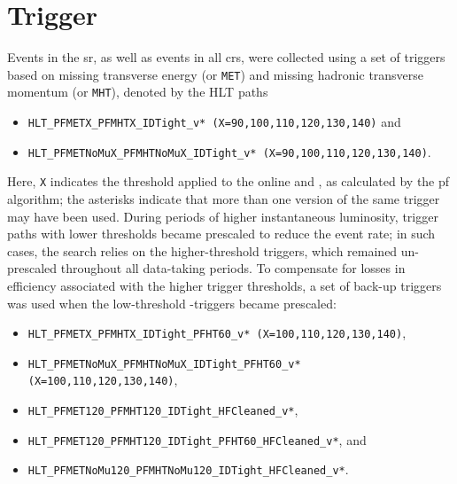 \clearpage
\section{Trigger}
\label{sec:trigger}

Events in the \gls{sr}, as well as events in all \glspl{cr}, were collected using a set of triggers based on missing transverse energy \MET (or {\tt MET}) and missing hadronic transverse momentum \mht (or {\tt MHT}), denoted by the HLT paths 

\begin{itemize}
\item
  \texttt{HLT\_PFMETX\_PFMHTX\_IDTight\_v* (X=90,100,110,120,130,140)} and
\item \texttt{HLT\_PFMETNoMuX\_PFMHTNoMuX\_IDTight\_v* (X=90,100,110,120,130,140)}.
\end{itemize}

Here, \texttt{X} indicates the threshold applied to the online \MET and \mht, as calculated by the \gls{pf} algorithm; the asterisks indicate that more than one version of the same trigger may have been used. During periods of higher instantaneous luminosity, trigger paths with lower thresholds became prescaled to reduce the
event rate; in such cases, the search relies on the higher-threshold triggers, which remained un-prescaled throughout all data-taking periods. To compensate for losses in efficiency associated with the higher trigger thresholds,  
a set of back-up triggers was used when the  low-threshold \MET-\mht triggers became prescaled:

\begin{itemize}
\item \texttt{HLT\_PFMETX\_PFMHTX\_IDTight\_PFHT60\_v* (X=100,110,120,130,140)},
\item \texttt{HLT\_PFMETNoMuX\_PFMHTNoMuX\_IDTight\_PFHT60\_v* (X=100,110,120,130,140)},
\item \texttt{HLT\_PFMET120\_PFMHT120\_IDTight\_HFCleaned\_v*},
\item \texttt{HLT\_PFMET120\_PFMHT120\_IDTight\_PFHT60\_HFCleaned\_v*}, and
\item \texttt{HLT\_PFMETNoMu120\_PFMHTNoMu120\_IDTight\_HFCleaned\_v*}.
\end{itemize}

